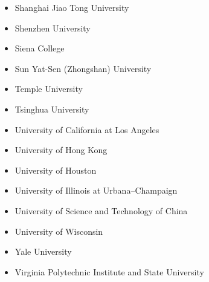 \begin{itemize}
\item Shanghai Jiao Tong University
\item Shenzhen University
\item Siena College
\item Sun Yat-Sen (Zhongshan) University
\item Temple University
\item Tsinghua University
\item University of California at Los Angeles
\item University of Hong Kong
\item University of Houston
\item University of Illinois at Urbana–Champaign
\item University of Science and Technology of China
\item University of Wisconsin
\item Yale University
\item Virginia Polytechnic Institute and State University
\end{itemize}

